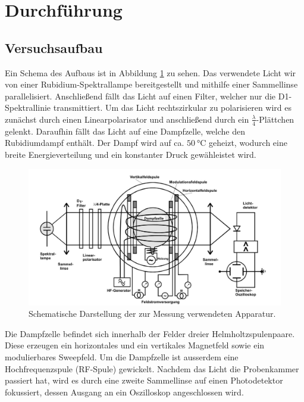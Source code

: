 \section{Durchführung}
\label{sec:Durchführung}
\subsection{Versuchsaufbau}
Ein Schema des Aufbaus ist in Abbildung \ref{fig:Aufbau} zu sehen.
Das verwendete Licht wir von einer Rubidium-Spektrallampe bereitgestellt und mithilfe einer Sammellinse parallelisiert. Anschließend fällt das Licht auf einen Filter, welcher nur die D1-Spektrallinie transmittiert. Um das Licht rechtszirkular zu polarisieren wird es zunächst durch einen Linearpolarisator und anschließend durch ein $\frac{\lambda}{4}$-Plättchen gelenkt. Daraufhin fällt das Licht auf eine Dampfzelle, welche den Rubidiumdampf enthält. Der Dampf wird auf ca. $\SI{50}{\celsius}$ geheizt, wodurch eine breite Energieverteilung und ein konstanter Druck gewähleistet wird.
\begin{figure}[H]
  \centering
  \includegraphics[width=\textwidth]{plots/Aufbau.JPG}
  \caption{Schematische Darstellung der zur Messung verwendeten Apparatur\cite{Anleitung}.}
  \label{fig:Aufbau}
\end{figure}
Die Dampfzelle befindet sich innerhalb der Felder dreier Helmholtzspulenpaare. Diese erzeugen ein horizontales und ein vertikales Magnetfeld sowie ein modulierbares Sweepfeld. Um die Dampfzelle ist ausserdem eine Hochfrequenzspule (RF-Spule) gewickelt.
Nachdem das Licht die Probenkammer passiert hat, wird es durch eine zweite Sammellinse auf einen Photodetektor fokussiert, dessen Ausgang an ein Oszilloskop angeschlossen wird.
